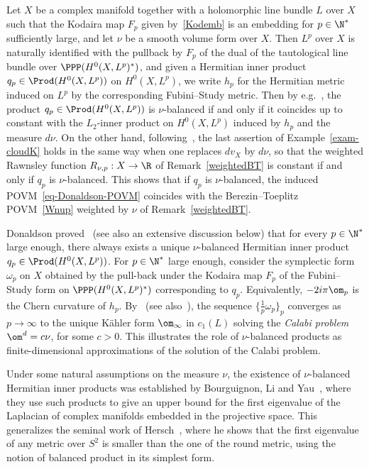 \begin{exam}\label{exam-balanced}
Let $X$ be a complex manifold together with a holomorphic line bundle $L$ over $X$ such that the Kodaira map $F_p$ given by~\eqref{Kodemb} is an embedding for $p\in\N^*$ sufficiently large, and let $\nu$ be a smooth volume form over $X$. Then $L^p$ over $X$ is naturally identified with the pullback by $F_p$ of the dual of the tautological line bundle over $\PPP(H^0(X,L^p)^*)$, and given a Hermitian inner product $q_p\in\Prod(H^0(X,L^p))$ on $H^0(X,L^p)$, we write $h_p$ for the Hermitian metric induced on $L^p$ by the corresponding Fubini--Study metric. Then by e.g.~\cite[p.~581]{D}, the product $q_p\in\Prod(H^0(X,L^p))$ is $\nu$-balanced if and only if it coincides up to constant with the $L_2$-inner product on $H^0(X,L^p)$ induced by $h_p$ and the measure $d\nu$. On the other hand, following~\cite[Section~4.19, Section~5.1.4]{MM07}, the last assertion of Example~\ref{exam-cloudK} holds in the same way when one replaces $dv_X$ by $d\nu$, so that the weighted Rawnsley function $R_{\nu,p}:X\rightarrow\R$ of Remark~\ref{weightedBT} is constant if and only if $q_p$ is $\nu$-balanced. This shows that if $q_p$ is $\nu$-balanced, the induced POVM~\eqref{eq-Donaldson-POVM} coincides with the Berezin--Toeplitz POVM~\eqref{Wnup} weighted by $\nu$ of Remark~\ref{weightedBT}.

Donaldson proved~\cite[p.~582]{D} (see also an extensive discussion below) that for every $p\in\N^*$ large enough, there always exists a unique $\nu$-balanced Hermitian inner product $q_p\in\Prod(H^0(X,L^p))$. For $p\in\N^*$ large enough, consider the symplectic form $\omega_p$ on $X$ obtained by the pull-back under the Kodaira map $F_p$ of the Fubini--Study form on $\PPP(H^0(X,L^p)^*)$ corresponding to $q_p$. Equivalently, $-2i\pi\om_p$ is the Chern curvature of $h_p$. By~\cite[p.~584]{D} (see also~\cite{Keller09}), the sequence $\{\frac{1}{p}\omega_p\}_p$ converges as $p\rightarrow\infty$ to the unique K\"ahler form $\om_\infty$ in $c_1(L)$ solving the \emph{Calabi problem} $\om^d=c\nu$, for some $c>0$. This illustrates the role of $\nu$-balanced products as finite-dimensional approximations of the solution of the Calabi problem.
\end{exam}


Under some natural assumptions on the measure $\nu$, the existence of $\nu$-balanced Hermitian inner products was established by Bourguignon, Li and Yau~\cite{BLY94}, where they use such products to give an upper bound for the first eigenvalue of the Laplacian of complex manifolds embedded in the projective space. This generalizes the seminal work of Hersch~\cite{Her70}, where he shows that the first eigenvalue of any metric over $S^2$ is smaller than the one of the round metric, using the notion of balanced product in its simplest form.

